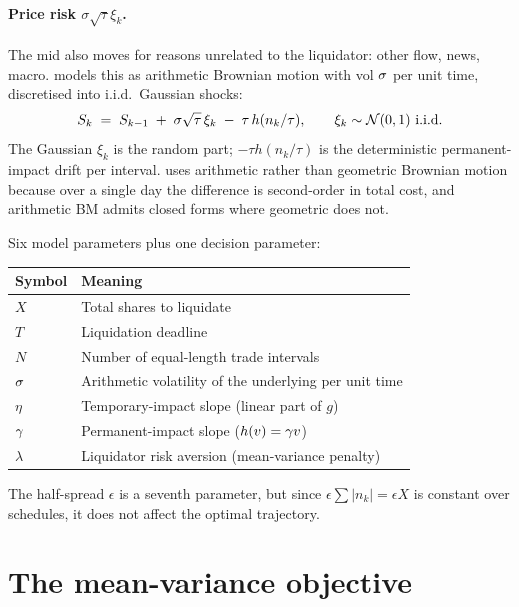 \paragraph{Price risk $\sigma\sqrt{\tau}\xi_k$.} The mid also moves
for reasons unrelated to the liquidator: other flow, news, macro.
\citeAC{} models this as arithmetic Brownian motion with vol
$\sigma$ per unit time, discretised into i.i.d.\ Gaussian shocks:
\begin{equation}
  S_k \;=\; S_{k-1} \;+\; \sigma\sqrt{\tau}\,\xi_k
    \;-\; \tau\, h(n_k/\tau),
  \qquad \xi_k \sim \mathcal{N}(0,1)\ \text{i.i.d.}
  \label{eq:ac_Srecur}
\end{equation}
The Gaussian $\xi_k$ is the random part; $-\tau h(n_k/\tau)$ is
the deterministic permanent-impact drift per interval. \citeAC{}
uses arithmetic rather than geometric Brownian motion because
over a single day the difference is second-order in total cost,
and arithmetic BM admits closed forms where geometric does not.

\begin{keyfactbox}
Six model parameters plus one decision parameter:
\begin{center}\begin{tabular}{ll}\toprule
  \textbf{Symbol} & \textbf{Meaning} \\ \midrule
  $X$      & Total shares to liquidate \\
  $T$      & Liquidation deadline \\
  $N$      & Number of equal-length trade intervals \\
  $\sigma$ & Arithmetic volatility of the underlying per unit time \\
  $\eta$   & Temporary-impact slope (linear part of $g$) \\
  $\gamma$& Permanent-impact slope ($h(v) = \gamma v$) \\ \midrule
  $\lambda$& Liquidator risk aversion (mean-variance penalty) \\
  \bottomrule
\end{tabular}\end{center}
The half-spread $\epsilon$ is a seventh parameter, but since
$\epsilon\sum|n_k| = \epsilon X$ is constant over schedules, it
does not affect the optimal trajectory.
\end{keyfactbox}

\section{The mean-variance objective}
\label{sec:ac_objective}

